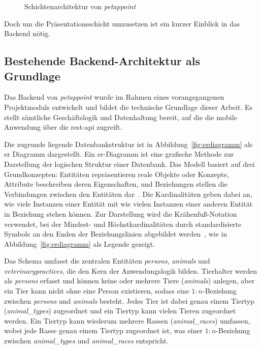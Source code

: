 \begin{figure}[H]
    \centering
    
    \caption{Schichtenarchitektur von \textit{petappoint}}
    \label{fig:softwarearchitecture}
\end{figure}

Doch um die Präsentationsschicht umzusetzen ist ein kurzer Einblick in das Backend nötig.

\subsection{Bestehende Backend-Architektur als Grundlage}

Das Backend von \textit{petappoint} wurde im Rahmen eines vorangegangenen Projektmoduls entwickelt und bildet die technische Grundlage dieser Arbeit. Es stellt sämtliche Geschäftslogik und Datenhaltung bereit, auf die die mobile Anwendung über die \gls{rest}-\gls{api} zugreift.

Die zugrunde liegende Datenbankstruktur ist in Abbildung~\ref{fig:erdiagramm} als \gls{er} Diagramm dargestellt. Ein \gls{er}-Diagramm ist eine grafische Methode zur Darstellung der logischen Struktur einer Datenbank. Das Modell basiert auf drei Grundkonzepten: Entitäten repräsentieren reale Objekte oder Konzepte, Attribute beschreiben deren Eigenschaften, und Beziehungen stellen die Verbindungen zwischen den Entitäten dar~\cite[S.~29]{watt2014}. Die Kardinalitäten geben dabei an, wie viele Instanzen einer Entität mit wie vielen Instanzen einer anderen Entität in Beziehung stehen können. Zur Darstellung wird die Krähenfuß-Notation verwendet, bei der Mindest- und Höchstkardinalitäten durch standardisierte Symbole an den Enden der Beziehungslinien abgebildet werden~\cite[S.~202]{balzert2009}, wie in 
Abbildung~\ref{fig:erdiagramm} als Legende gezeigt. 

Das Schema umfasst die zentralen Entitäten \textit{persons}, \textit{animals} und \textit{veterinarypractices}, die den Kern der Anwendungslogik bilden. Tierhalter werden als \textit{persons} erfasst und können keine oder mehrere Tiere (\textit{animals}) anlegen, aber ein Tier kann nicht ohne eine Person existieren, sodass eine $1{:}n$-Beziehung zwischen \textit{persons} und \textit{animals} besteht. Jedes Tier ist dabei genau einem Tiertyp (\textit{animal\_types}) zugeordnet und ein Tiertyp kann vielen Tieren zugeordnet werden. Ein Tiertyp kann wiederum mehrere Rassen (\textit{animal\_races}) umfassen, wobei jede Rasse genau einem Tiertyp zugeordnet ist, was einer $1{:}n$-Beziehung zwischen \textit{animal\_types} und \textit{animal\_races} entspricht.

